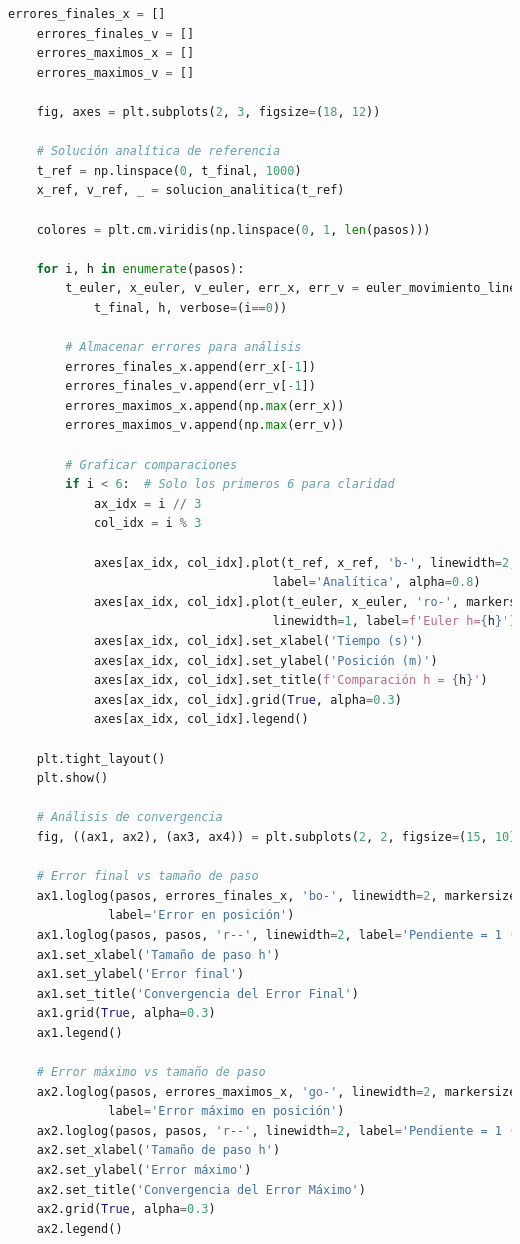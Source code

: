 \documentclass{article}
\begin{document}
\begin{lstlisting}[language=Python, caption={Implementación detallada del método de Euler}]
    errores_finales_x = []
    errores_finales_v = []
    errores_maximos_x = []
    errores_maximos_v = []
    
    fig, axes = plt.subplots(2, 3, figsize=(18, 12))
    
    # Solución analítica de referencia
    t_ref = np.linspace(0, t_final, 1000)
    x_ref, v_ref, _ = solucion_analitica(t_ref)
    
    colores = plt.cm.viridis(np.linspace(0, 1, len(pasos)))
    
    for i, h in enumerate(pasos):
        t_euler, x_euler, v_euler, err_x, err_v = euler_movimiento_lineal(
            t_final, h, verbose=(i==0))
        
        # Almacenar errores para análisis
        errores_finales_x.append(err_x[-1])
        errores_finales_v.append(err_v[-1])
        errores_maximos_x.append(np.max(err_x))
        errores_maximos_v.append(np.max(err_v))
        
        # Graficar comparaciones
        if i < 6:  # Solo los primeros 6 para claridad
            ax_idx = i // 3
            col_idx = i % 3
            
            axes[ax_idx, col_idx].plot(t_ref, x_ref, 'b-', linewidth=2, 
                                     label='Analítica', alpha=0.8)
            axes[ax_idx, col_idx].plot(t_euler, x_euler, 'ro-', markersize=3, 
                                     linewidth=1, label=f'Euler h={h}')
            axes[ax_idx, col_idx].set_xlabel('Tiempo (s)')
            axes[ax_idx, col_idx].set_ylabel('Posición (m)')
            axes[ax_idx, col_idx].set_title(f'Comparación h = {h}')
            axes[ax_idx, col_idx].grid(True, alpha=0.3)
            axes[ax_idx, col_idx].legend()
    
    plt.tight_layout()
    plt.show()
    
    # Análisis de convergencia
    fig, ((ax1, ax2), (ax3, ax4)) = plt.subplots(2, 2, figsize=(15, 10))
    
    # Error final vs tamaño de paso
    ax1.loglog(pasos, errores_finales_x, 'bo-', linewidth=2, markersize=8, 
              label='Error en posición')
    ax1.loglog(pasos, pasos, 'r--', linewidth=2, label='Pendiente = 1 (teórica)')
    ax1.set_xlabel('Tamaño de paso h')
    ax1.set_ylabel('Error final')
    ax1.set_title('Convergencia del Error Final')
    ax1.grid(True, alpha=0.3)
    ax1.legend()
    
    # Error máximo vs tamaño de paso
    ax2.loglog(pasos, errores_maximos_x, 'go-', linewidth=2, markersize=8,
              label='Error máximo en posición')
    ax2.loglog(pasos, pasos, 'r--', linewidth=2, label='Pendiente = 1 (teórica)')
    ax2.set_xlabel('Tamaño de paso h')
    ax2.set_ylabel('Error máximo')
    ax2.set_title('Convergencia del Error Máximo')
    ax2.grid(True, alpha=0.3)
    ax2.legend()
    

\end{lstlisting}
\end{document}
